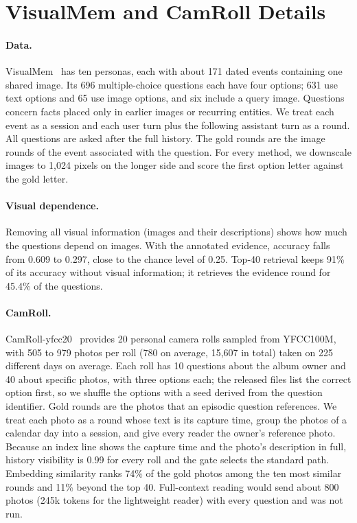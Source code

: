 \section{VisualMem and CamRoll Details}
\label{app:visualmem}

\paragraph{Data.} VisualMem~\citep{nguyen2026personalvisual} has ten personas, each with about 171 dated events containing one shared image. Its 696 multiple-choice questions each have four options; 631 use text options and 65 use image options, and six include a query image. Questions concern facts placed only in earlier images or recurring entities. We treat each event as a session and each user turn plus the following assistant turn as a round. All questions are asked after the full history. The gold rounds are the image rounds of the event associated with the question. For every method, we downscale images to 1,024 pixels on the longer side and score the first option letter against the gold letter.

\paragraph{Visual dependence.} Removing all visual information (images and their descriptions) shows how much the questions depend on images. With the annotated evidence, accuracy falls from 0.609 to 0.297, close to the chance level of 0.25. Top-40 retrieval keeps 91\% of its accuracy without visual information; it retrieves the evidence round for 45.4\% of the questions.

\paragraph{CamRoll.} CamRoll-yfcc20~\citep{nguyen2026camroll} provides 20 personal camera rolls sampled from YFCC100M, with 505 to 979 photos per roll (780 on average, 15,607 in total) taken on 225 different days on average. Each roll has 10 questions about the album owner and 40 about specific photos, with three options each; the released files list the correct option first, so we shuffle the options with a seed derived from the question identifier. Gold rounds are the photos that an episodic question references. We treat each photo as a round whose text is its capture time, group the photos of a calendar day into a session, and give every reader the owner's reference photo. Because an index line shows the capture time and the photo's description in full, history visibility is 0.99 for every roll and the gate selects the standard path. Embedding similarity ranks 74\% of the gold photos among the ten most similar rounds and 11\% beyond the top 40. Full-context reading would send about 800 photos (245k tokens for the lightweight reader) with every question and was not run.

